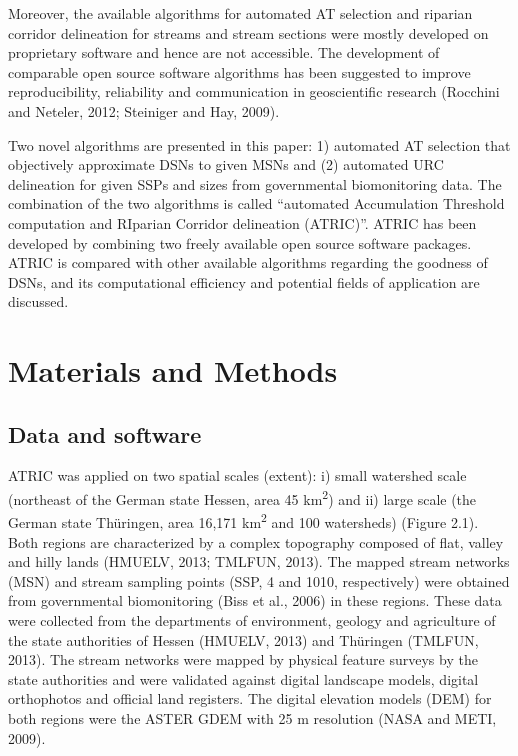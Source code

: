 Moreover, the available algorithms for automated AT selection and riparian corridor delineation for streams and stream sections were mostly developed on proprietary software and hence are not accessible. The development of comparable open source software algorithms has been suggested to improve reproducibility, reliability and communication in geoscientific research (Rocchini and Neteler, 2012; Steiniger and Hay, 2009).

Two novel algorithms are presented in this paper: 1) automated AT selection that objectively approximate DSNs to given MSNs and (2) automated URC delineation for given SSPs and sizes from governmental biomonitoring data.    The combination of the two algorithms is called “automated Accumulation Threshold computation and RIparian Corridor delineation (ATRIC)”. ATRIC has been developed by combining two freely available open source software packages. ATRIC is compared with other available algorithms regarding the goodness of DSNs, and its computational efficiency and potential fields of application are discussed.

\section{Materials and Methods}
\label{materials and methods}

\subsection{Data and software}
\label{data and software}

ATRIC was applied on two spatial scales (extent): i) small watershed scale (northeast of the German state Hessen, area 45 km\textsuperscript{2}) and ii) large scale (the German state Thüringen, area 16,171 km\textsuperscript{2} and 100 watersheds) (Figure 2.1). Both regions are characterized by a complex topography composed of flat, valley and hilly lands (HMUELV, 2013; TMLFUN, 2013). The mapped stream networks (MSN) and stream sampling points (SSP, 4 and 1010, respectively) were obtained from governmental biomonitoring (Biss et al., 2006) in these regions. These data were collected from the departments of environment, geology and agriculture of the state authorities of Hessen (HMUELV, 2013) and Thüringen (TMLFUN, 2013). The stream networks were mapped by physical feature surveys by the state authorities and were validated against digital landscape models, digital orthophotos and official land registers. The digital elevation models (DEM) for both regions were the ASTER GDEM with 25 m resolution (NASA and METI, 2009).

